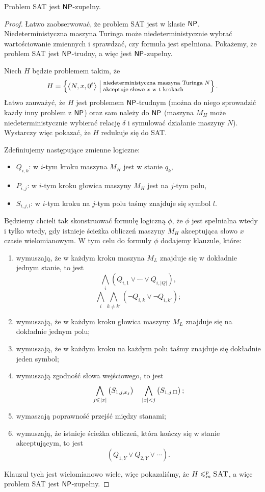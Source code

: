 \begin{theorem}\label{t:Cook-Levin}
    Problem SAT jest $\NPclass$-zupełny.
\end{theorem}
\begin{proof}
    Łatwo zaobserwować, że problem SAT jest w klasie $\NPclass$. Niedeterministyczna maszyna Turinga może niedeterministycznie wybrać wartościowanie zmiennych i sprawdzać, czy formuła jest spełniona. Pokażemy, że problem SAT jest $\NPclass$-trudny, a więc jest $\NPclass$-zupełny.

    Niech $H$ będzie problemem takim, że
    \[ H = \left\{\encode{N, x, 0^t} \Bigm| \parbox{15em}{\footnotesize niedeterministyczna maszyna Turinga $N$ akceptuje słowo $x$ w $t$ krokach}\right\}. \]
    Łatwo zauważyć, że $H$ jest problemem $\NPclass$-trudnym (można do niego sprowadzić każdy inny problem z $\NPclass$) oraz sam należy do $\NPclass$ (maszyna $M_H$ może niedeterministycznie wybierać relację $\delta$ i symulować działanie maszyny $N$).
    Wystarczy więc pokazać, że $H$ redukuje się do SAT.

    Zdefiniujemy następujące zmienne logiczne:
    \begin{itemize}
        \item $Q_{i, k}$: w $i$-tym kroku maszyna $M_H$ jest w stanie $q_k$,
        \item $P_{i, j}$: w $i$-tym kroku głowica maszyny $M_H$ jest na $j$-tym polu,
        \item $S_{i, j, l}$: w $i$-tym kroku na $j$-tym polu taśmy znajduje się symbol $l$.
    \end{itemize}
    Będziemy chcieli tak skonstruować formułę logiczną $\phi$, że $\phi$ jest spełnialna wtedy i tylko wtedy, gdy istnieje ścieżka obliczeń maszyny $M_H$ akceptująca słowo $x$ czasie wielomianowym. W tym celu do formuły $\phi$ dodajemy klauzule, które:
    \begin{enumerate}
        \item wymuszają, że w każdym kroku maszyna $M_L$ znajduje się w dokładnie jednym stanie, to jest
        \[ \bigwedge_i \left(Q_{i, 1} \lor \cdots \lor Q_{i, |Q|}\right), \]
        \[ \bigwedge_i \bigwedge_{k \neq k'} \left(\neg Q_{i, k} \lor \neg Q_{i, k'}\right); \]
        \item wymuszają, że w każdym kroku głowica maszyny $M_L$ znajduje się na dokładnie jednym polu;
        \item wymuszają, że w każdym kroku na każdym polu taśmy znajduje się dokładnie jeden symbol;
        \item wymuszają zgodność słowa wejściowego, to jest
        \[ \bigwedge_{j \leq |x|} \left(S_{1, j, x_j}\right) \quad \bigwedge_{|x| < j} \left(S_{1, j, \blank}\right); \]
        \item wymaszają poprawność przejść między stanami;
        \item wymuszają, że istnieje ścieżka obliczeń, która kończy się w stanie akceptującym, to jest
        \[ \left( Q_{1, Y} \lor Q_{2, Y} \lor \cdots \right). \]
    \end{enumerate}
    Klauzul tych jest wielomianowo wiele, więc pokazaliśmy, że $H \leq_m^p \textsc{SAT}$, a więc problem SAT jest $\NPclass$-zupełny.
\end{proof}

